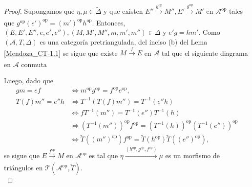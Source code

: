 \documentclass[tesis]{subfiles}
\begin{document}
\begin{proof}
    Supongamos que $\eta,\mu\in\tilde{\Delta}$ y que existen $E''\xrightarrow[]{h^\text{op}}M'', E'\xrightarrow[]{g^\text{op}}M'$ en $\mathscr{A}^\text{op}$ tales que $g^\text{op}(e')^\text{op} = (m')^\text{op}h^\text{op}$. Entonces, $(E,E',E'',e,e',e''),(M,M',M'',m,m',m'')\in\Delta$ y $e'g = hm'$. Como $(\mathscr{A},T,\Delta)$ es una categoría pretriangulada, del inciso (b) del Lema \ref{Mendoza_CT-1.1} se sigue que existe $M\xrightarrow[]{f}E$ en $\mathscr{A}$ tal que el siguiente diagrama en $\mathscr{A}$ conmuta
    \begin{center}
    \end{center}
    Luego, dado que
    \begin{align*}
        gm = ef &\iff m^\text{op}g^\text{op} = f^\text{op}e^\text{op}, \\
            T(f)m'' = e''h &\iff T^{-1}(T(f)m'') = T^{-1}(e''h) \\
                           &\iff fT^{-1}(m'') = T^{-1}(e'')T^{-1}(h) \\
                           &\iff (T^{-1}(m''))^\text{op}f^\text{op} = (T^{-1}(h))^\text{op}(T^{-1}(e''))^\text{op} \\
                           &\iff \tilde{T}((m'')^\text{op})f^\text{op} = \tilde{T}(h^\text{op}) \tilde{T}((e'')^\text{op}),
    \end{align*}
    se sigue que $E\xrightarrow[]{f^\text{op}}M$ en $\mathscr{A}^\text{op}$ es tal que $\eta\xrightarrow[]{(h^\text{op},g^\text{op},f^\text{op})}\mu$ es un morfismo de triángulos en $\mathscr{T}(\mathscr{A}^\text{op},\tilde{T})$. \\
    

\end{proof}
\end{document}
